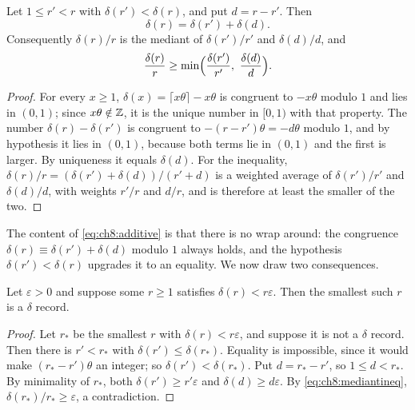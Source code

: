 \begin{lemma}\label{lem:ch8:mediant}
Let $1\leq r'<r$ with $\delta(r')<\delta(r)$, and put $d=r-r'$. Then
\begin{equation}\label{eq:ch8:additive}
  \delta(r)=\delta(r')+\delta(d).
\end{equation}
Consequently $\delta(r)/r$ is the mediant of $\delta(r')/r'$ and
$\delta(d)/d$, and
\begin{equation}\label{eq:ch8:mediantineq}
  \frac{\delta(r)}{r}\geq\min\Bigl(\frac{\delta(r')}{r'},\
  \frac{\delta(d)}{d}\Bigr).
\end{equation}
\end{lemma}

\begin{proof}
For every $x\geq1$, $\delta(x)=\lceil x\theta\rceil-x\theta$ is congruent to
$-x\theta$ modulo $1$ and lies in $(0,1)$; since $x\theta\notin\mathbb{Z}$, it is
the unique number in $[0,1)$ with that property. The number
$\delta(r)-\delta(r')$ is congruent to $-(r-r')\theta=-d\theta$ modulo $1$, and
by hypothesis it lies in $(0,1)$, because both terms lie in $(0,1)$ and the
first is larger. By uniqueness it equals $\delta(d)$. For the inequality,
$\delta(r)/r=(\delta(r')+\delta(d))/(r'+d)$ is a weighted average of
$\delta(r')/r'$ and $\delta(d)/d$, with weights $r'/r$ and $d/r$, and is
therefore at least the smaller of the two.
\end{proof}

The content of \eqref{eq:ch8:additive} is that there is no wrap around: the
congruence $\delta(r)\equiv\delta(r')+\delta(d)$ modulo $1$ always holds, and
the hypothesis $\delta(r')<\delta(r)$ upgrades it to an equality. We now draw
two consequences.

\begin{corollary}\label{cor:ch8:firstfeasible}
Let $\varepsilon>0$ and suppose some $r\geq1$ satisfies
$\delta(r)<r\varepsilon$. Then the smallest such $r$ is a $\delta$ record.
\end{corollary}

\begin{proof}
Let $r_*$ be the smallest $r$ with $\delta(r)<r\varepsilon$, and suppose it is
not a $\delta$ record. Then there is $r'<r_*$ with $\delta(r')\leq\delta(r_*)$.
Equality is impossible, since it would make $(r_*-r')\theta$ an integer; so
$\delta(r')<\delta(r_*)$. Put $d=r_*-r'$, so $1\leq d<r_*$. By minimality of
$r_*$, both $\delta(r')\geq r'\varepsilon$ and $\delta(d)\geq d\varepsilon$.
By \eqref{eq:ch8:mediantineq}, $\delta(r_*)/r_*\geq\varepsilon$, a
contradiction.
\end{proof}

